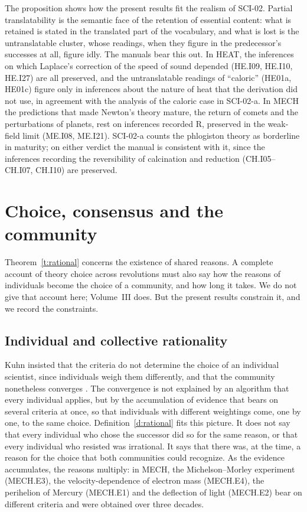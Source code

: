 \documentclass{situationist-preprint}
\begin{document}
The proposition shows how the present results fit the realism of SCI-02. Partial translatability is the semantic face of the retention of essential content: what is retained is stated in the translated part of the vocabulary, and what is lost is the untranslatable cluster, whose readings, when they figure in the predecessor's successes at all, figure idly. The manuals bear this out. In HEAT, the inferences on which Laplace's correction of the speed of sound depended (HE.I09, HE.I10, HE.I27) are all preserved, and the untranslatable readings of \enquote{caloric} (HE01a, HE01c) figure only in inferences about the nature of heat that the derivation did not use, in agreement with the analysis of the caloric case in SCI-02-a. In MECH the predictions that made Newton's theory mature, the return of comets and the perturbations of planets, rest on inferences recorded R, preserved in the weak-field limit (ME.I08, ME.I21). SCI-02-a counts the phlogiston theory as borderline in maturity; on either verdict the manual is consistent with it, since the inferences recording the reversibility of calcination and reduction (CH.I05--CH.I07, CH.I10) are preserved.

\section{Choice, consensus and the community}\label{s:community}

Theorem~\ref{t:rational} concerns the existence of shared reasons. A complete account of theory choice across revolutions must also say how the reasons of individuals become the choice of a community, and how long it takes. We do not give that account here; Volume~III does. But the present results constrain it, and we record the constraints.

\subsection{Individual and collective rationality}

Kuhn insisted that the criteria do not determine the choice of an individual scientist, since individuals weigh them differently, and that the community nonetheless converges \citep{Kuhn1977}. The convergence is not explained by an algorithm that every individual applies, but by the accumulation of evidence that bears on several criteria at once, so that individuals with different weightings come, one by one, to the same choice. Definition~\ref{d:rational} fits this picture. It does not say that every individual who chose the successor did so for the same reason, or that every individual who resisted was irrational. It says that there was, at the time, a reason for the choice that both communities could recognize. As the evidence accumulates, the reasons multiply: in MECH, the Michelson--Morley experiment (MECH.E3), the velocity-dependence of electron mass (MECH.E4), the perihelion of Mercury (MECH.E1) and the deflection of light (MECH.E2) bear on different criteria and were obtained over three decades.
\end{document}
